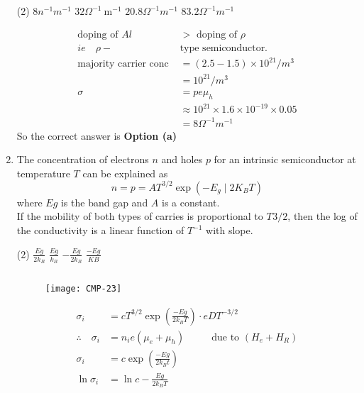 \begin{enumerate}
	\begin{tasks}(2)
		\task[\textbf{a.}]$8 n^{-1} m^{-1}$
		\task[\textbf{b.}]$32 \Omega^{-1} \mathrm{~m}^{-1}$
		\task[\textbf{c.}]$20.8\Omega^{-1}m^{-1}$
		\task[\textbf{d.}]  $83.2 \Omega^{-1}m^{-1}$
	\end{tasks}
\begin{answer}
	\begin{align*}
	\text{doping of }Al&>\text{ doping of }\rho\\
	ie \quad\rho-&\text{type semiconductor.}\\
	\text{majority carrier conc }&=(2.5-1.5)\times10^{21}/m^3\\
	&=10^{21}/m^3\\
	\sigma &=p e \mu_{h} \\
	& \approx 10^{21} \times 1.6 \times 10^{-19} \times 0.05\\
	&=8\Omega^{-1}m^{-1}
	\end{align*}
	So the correct answer is \textbf{Option (a)}
\end{answer}
\item 
	The concentration of electrons $n$ and holes $p$ for an intrinsic semiconductor at temperature $T$ can be explained as 
	$$n=p=A T^{3 / 2} \exp \left(-E_{g} \mid 2 K_{B} T\right)$$
	where $Eg$ is the band gap and $A$ is a constant.\\
	If the mobility of both types of carries is proportional to $T^{}3/2$, then the log of the conductivity is a linear function of $T^{-1}$ with slope.
	\begin{tasks}(2)
		\task[\textbf{a.}]$\frac{E g}{2 k_{B}}$
		\task[\textbf{b.}]$\frac{E g}{k_{B}}$
		\task[\textbf{c.}]$-\frac{E g}{2 k_{B}}$
		\task[\textbf{d.}] $\frac{-E g}{K B}$
	\end{tasks}
\begin{answer}$\left. \right. $
	\begin{figure}[H]
		\centering
		\texttt{[image: CMP-23]}
		\caption{}
		\label{}
	\end{figure}
	\begin{align*}
	\sigma_{i}&=c T^{3 / 2} \exp \left(\frac{-E g}{2 k_{B} T}\right) \cdot e D T^{-3 / 2}\\
	\therefore \quad \sigma_{i}&=n_{i} e\left(\mu_{e}+\mu_{h}\right)\hspace{1cm}\text { due to }\left(H_{e}+H_{R}\right)\\
	\sigma_{i}&=c \exp \left(\frac{-E g}{2 k_{B} t}\right)\\
	\ln \sigma_{i}&=\ln c-\frac{E g}{2 k_{B} T}\\

\end{align*}
\end{answer}
\end{enumerate}
